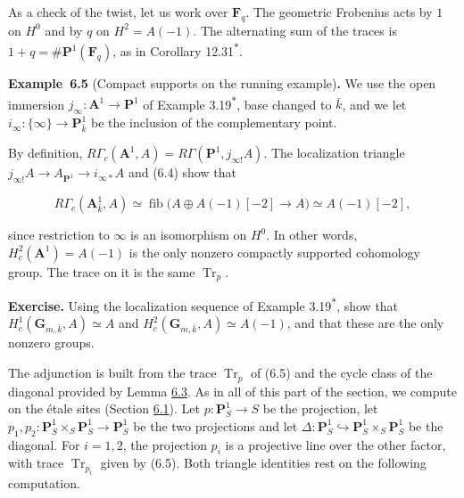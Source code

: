 \documentclass[11pt]{article}
\newenvironment{bpstatement}[2]{\par\addvspace{0.6\baselineskip}\noindent\textbf{#1}#2\textbf{.}\enspace\ignorespaces}
  {\par\addvspace{0.4\baselineskip}}
\newcommand{\bpout}[1]{#1\textsuperscript{\hyperlink{bp-outside}{\ensuremath{\ast}}}}
\providecommand{\fib}{}\renewcommand{\fib}{\operatorname{fib}}
\begin{document}
As a check of the twist, let us work over \(\mathbf F_q\). The geometric Frobenius acts by \(1\) on \(H^0\) and by \(q\) on \(H^2=A(-1)\). The alternating sum of the traces is \(1+q=\#\mathbf P^1(\mathbf F_q)\), as in Corollary \bpout{12.31}.

\label{bp17}%
\begin{bpstatement}{Example~6.5}{ (Compact supports on the running example)}
We use the open immersion \(j_\infty:\mathbf A^1\to\mathbf P^1\) of Example \bpout{3.19}, base changed to \(\bar k\), and we let \(i_\infty:\{\infty\}\to\mathbf P^1_{\bar k}\) be the inclusion of the complementary point.

By definition, \(R\Gamma_c(\mathbf A^1,A)=R\Gamma(\mathbf P^1,j_{\infty!}A)\). The localization triangle \(j_{\infty!}A\to A_{\mathbf P^1}\to i_{\infty*}A\) and (6.4) show that

\[
R\Gamma_c(\mathbf A^1_{\bar k},A)
\simeq\fib\bigl(A\oplus A(-1)[-2]\to A\bigr)
\simeq A(-1)[-2],
\]

since restriction to \(\infty\) is an isomorphism on \(H^0\). In other words, \(H^2_c(\mathbf A^1)=A(-1)\) is the only nonzero compactly supported cohomology group. The trace on it is the same \(\operatorname{Tr}_p\).
\end{bpstatement}

\label{bp18}%
\textbf{Exercise.} Using the localization sequence of Example \bpout{3.19}, show that \(H^1_c(\mathbf G_{m,\bar k},A)\simeq A\) and \(H^2_c(\mathbf G_{m,\bar k},A)\simeq A(-1)\), and that these are the only nonzero groups.

The adjunction is built from the trace \(\operatorname{Tr}_p\) of (6.5) and the cycle class of the diagonal provided by Lemma \hyperref[bp11]{6.3}. As in all of this part of the section, we compute on the étale sites (Section \hyperref[bp3]{6.1}). Let \(p:\mathbf P^1_S\to S\) be the projection, let \(p_1,p_2:\mathbf P^1_S\times_S\mathbf P^1_S\to\mathbf P^1_S\) be the two projections and let \(\Delta:\mathbf P^1_S\hookrightarrow\mathbf P^1_S\times_S\mathbf P^1_S\) be the diagonal. For \(i=1,2\), the projection \(p_i\) is a projective line over the other factor, with trace \(\operatorname{Tr}_{p_i}\) given by (6.5). Both triangle identities rest on the following computation.
\end{document}
